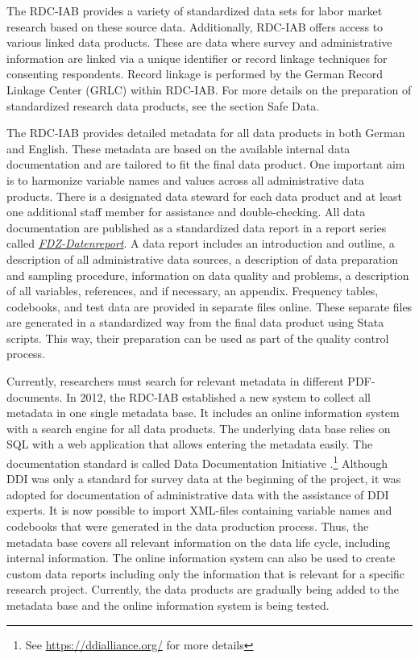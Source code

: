 The RDC-IAB provides a variety of standardized data sets for labor market research based on these source data. Additionally, RDC-IAB offers access to various linked data products. These are data where survey and administrative information are linked via a unique identifier or record linkage techniques for consenting respondents. Record linkage is performed by the German Record Linkage Center (GRLC) within RDC-IAB. For more details on the preparation of standardized research data products, see the section Safe Data.

The RDC-IAB provides detailed metadata for all data products in both German and English. These metadata are based on the available internal data documentation and are tailored to fit the final data product. One important aim is to harmonize variable names and values across all administrative data products. There is a designated data steward for each data product and at least one additional staff member for assistance and double-checking. All data documentation are published as a standardized data report in a report series called \href{https://fdz.iab.de/en/FDZ_Publications/FDZ_Publication_Series/FDZ-Datenreporte.aspx}{\emph{FDZ-Datenreport}}. A data report includes an introduction and outline, a description of all administrative data sources, a description of data preparation and sampling procedure, information on data quality and problems, a description of all variables, references, and if necessary, an appendix. Frequency tables, codebooks, and test data are provided in separate files online. These separate files are generated in a standardized way from the final data product using Stata scripts. This way, their preparation can be used as part of the quality control process.

Currently, researchers must search for relevant metadata in different PDF-documents. In 2012, the RDC-IAB established a new system to collect all metadata in one single metadata base. It includes an online information system with a search engine for all data products. The underlying data base relies on SQL with a web application that allows entering the metadata easily. The documentation standard is called Data Documentation Initiative \citep{vardigan2008}.\footnote{See \url{https://ddialliance.org/} for more details} Although DDI was only a standard for survey data at the beginning of the project, it was adopted for documentation of administrative data with the assistance of DDI experts. It is now possible to import XML-files containing variable names and codebooks that were generated in the data production process. Thus, the metadata base covers all relevant information on the data life cycle, including internal information. The online information system can also be used to create custom data reports including only the information that is relevant for a specific research project. Currently, the data products are gradually being added to the metadata base and the online information system is being tested.

